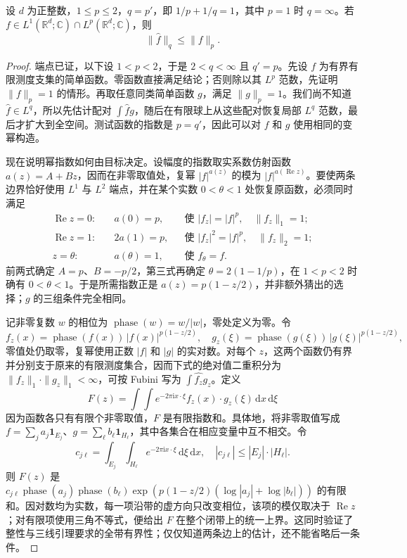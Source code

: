 \begin{theorem}\label{b2:thm:04-hausdorff-young}
设 \(d\) 为正整数，\(1\leq p\leq2\)，\(q=p'\)，即 \(1/p+1/q=1\)，其中 \(p=1\) 时 \(q=\infty\)。若 \(f\in L^1(\mathbb R^d;\mathbb C)\cap L^p(\mathbb R^d;\mathbb C)\)，则
\[
 \|\widehat f\|_q\leq\|f\|_p.
\]
\end{theorem}
\begin{proof}
端点已证，以下设 \(1<p<2\)，于是 \(2<q<\infty\) 且 \(q'=p\)。先设 \(f\) 为有界有限测度支集的简单函数。零函数直接满足结论；否则除以其 \(L^p\) 范数，先证明 \(\|f\|_p=1\) 的情形。再取任意同类简单函数 \(g\)，满足 \(\|g\|_p=1\)。我们尚不知道 \(\widehat f\in L^q\)，所以先估计配对 \(\int\widehat f g\)，随后在有限球上从这些配对恢复局部 \(L^q\) 范数，最后才扩大到全空间。测试函数的指数是 \(p=q'\)，因此可以对 \(f\) 和 \(g\) 使用相同的变幂构造。

现在说明幂指数如何由目标决定。设幅度的指数取实系数仿射函数 \(a(z)=A+Bz\)，因而在非零取值处，复幂 \(|f|^{a(z)}\) 的模为 \(|f|^{a(\operatorname{Re}z)}\)。要使两条边界恰好使用 \(L^1\) 与 \(L^2\) 端点，并在某个实数 \(0<\theta<1\) 处恢复原函数，必须同时满足
\[
 \begin{aligned}
  \operatorname{Re}z=0:&\quad a(0)=p,
       &&\text{使 }|f_z|=|f|^p,\quad\|f_z\|_1=1;\\
  \operatorname{Re}z=1:&\quad 2a(1)=p,
       &&\text{使 }|f_z|^2=|f|^p,\quad\|f_z\|_2=1;\\
  z=\theta:&\quad a(\theta)=1,
       &&\text{使 }f_\theta=f.
 \end{aligned}
\]
前两式确定 \(A=p\)、\(B=-p/2\)，第三式再确定 \(\theta=2(1-1/p)\)，在 \(1<p<2\) 时确有 \(0<\theta<1\)。于是所需指数正是 \(a(z)=p(1-z/2)\)，并非额外猜出的选择；\(g\) 的三组条件完全相同。

记非零复数 \(w\) 的相位为 \(\operatorname{phase}(w)=w/|w|\)，零处定义为零。令
\[
 f_z(x)=\operatorname{phase}(f(x))\,|f(x)|^{p(1-z/2)},
 \quad g_z(\xi)=\operatorname{phase}(g(\xi))\,|g(\xi)|^{p(1-z/2)},
\]
零值处仍取零，复幂使用正数 \(|f|\) 和 \(|g|\) 的实对数。对每个 \(z\)，这两个函数仍有界并分别支于原来的有限测度集合，因而下式的绝对值二重积分为 \(\|f_z\|_1\cdot\|g_z\|_1<\infty\)，可按 Fubini 写为 \(\int\widehat {f_z}g_z\)。定义
\[
 F(z)=\int\!\int e^{-2\pi\mathrm{i}x\cdot\xi}f_z(x)\cdot g_z(\xi)\,\mathrm{d}x\,\mathrm{d}\xi
\]
因为函数各只有有限个非零取值，\(F\) 是有限指数和。具体地，将非零取值写成 \(f=\sum_j a_j\mathbf1_{E_j}\)、\(g=\sum_\ell b_\ell\mathbf1_{H_\ell}\)，其中各集合在相应变量中互不相交。令
\[
 c_{j\ell}=\int_{E_j}\int_{H_\ell}e^{-2\pi\mathrm{i}x\cdot\xi}\,\mathrm{d}\xi\,\mathrm{d}x,
 \quad |c_{j\ell}|\leq |E_j|\cdot|H_\ell|.
\]
则 \(F(z)\) 是 \(c_{j\ell}\operatorname{phase}(a_j)\operatorname{phase}(b_\ell)\exp(p(1-z/2)(\log|a_j|+\log|b_\ell|))\) 的有限和。因对数均为实数，每一项沿带的虚方向只改变相位，该项的模仅取决于 \(\operatorname{Re}z\)；对有限项使用三角不等式，便给出 \(F\) 在整个闭带上的统一上界。这同时验证了整性与三线引理要求的全带有界性；仅仅知道两条边上的估计，还不能省略后一条件。


\end{proof}

